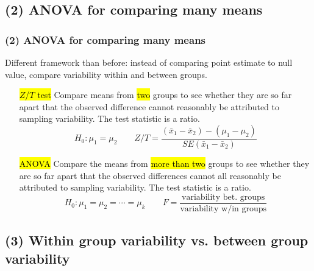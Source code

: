\documentclass[slidestop,compress,mathserif]{beamer}
\begin{document}

\subsection{(2) ANOVA for comparing many means}


\begin{frame}
\frametitle{(2) ANOVA for comparing many means}

Different framework than before: instead of comparing point estimate to null value, compare variability within and between groups.

\pause

\begin{itemize}
\item[\hl{$Z$/$T$ test}] Compare means from \hl{two} groups to see whether they are so far apart that the observed difference cannot reasonably be attributed to sampling variability. The test statistic is a ratio.
\[ H_0: \mu_1 = \mu_2 \qquad
Z / T = \frac{(\bar{x}_1 - \bar{x}_2) - (\mu_1 - \mu_2)}{SE(\bar{x}_1 - \bar{x}_2)} \]

\pause

\item[\hl{ANOVA}] Compare the means from \hl{more than two} groups to see whether they are so far apart that the observed differences cannot all reasonably be attributed to sampling variability. The test statistic is a ratio.
\[ H_0: \mu_1 = \mu_2 = \cdots = \mu_k \qquad F = \frac{\text{variability bet. groups}}{\text{variability w/in groups}} \]
\end{itemize}

\end{frame}


\subsection{(3) Within group variability vs. between group variability} 

\end{document}
